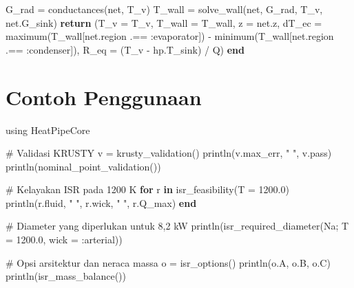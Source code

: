 \documentclass[
  indonesian,
  12pt,
  a4paper,
]{report}
\newenvironment{Shaded}{\begin{snugshade}}{\end{snugshade}}
\newcommand{\BuiltInTok}[1]{\textcolor[rgb]{0.00,0.23,0.31}{#1}}
\newcommand{\CommentTok}[1]{\textcolor[rgb]{0.37,0.37,0.37}{#1}}
\newcommand{\ControlFlowTok}[1]{\textcolor[rgb]{0.00,0.23,0.31}{\textbf{#1}}}
\newcommand{\FloatTok}[1]{\textcolor[rgb]{0.68,0.00,0.00}{#1}}
\newcommand{\FunctionTok}[1]{\textcolor[rgb]{0.28,0.35,0.67}{#1}}
\newcommand{\ImportTok}[1]{\textcolor[rgb]{0.00,0.46,0.62}{#1}}
\newcommand{\KeywordTok}[1]{\textcolor[rgb]{0.00,0.23,0.31}{\textbf{#1}}}
\newcommand{\NormalTok}[1]{\textcolor[rgb]{0.00,0.23,0.31}{#1}}
\newcommand{\OperatorTok}[1]{\textcolor[rgb]{0.37,0.37,0.37}{#1}}
\newcommand{\StringTok}[1]{\textcolor[rgb]{0.13,0.47,0.30}{#1}}
\begin{document}
\begin{Shaded}
\begin{Highlighting}[]
\NormalTok{    G\_rad }\OperatorTok{=} \FunctionTok{conductances}\NormalTok{(net, T\_v)}
\NormalTok{    T\_wall }\OperatorTok{=} \FunctionTok{solve\_wall}\NormalTok{(net, G\_rad, T\_v, net.G\_sink)}
    \ControlFlowTok{return}\NormalTok{ (T\_v }\OperatorTok{=}\NormalTok{ T\_v, T\_wall }\OperatorTok{=}\NormalTok{ T\_wall, z }\OperatorTok{=}\NormalTok{ net.z,}
\NormalTok{            dT\_ec }\OperatorTok{=} \FunctionTok{maximum}\NormalTok{(T\_wall[net.region }\OperatorTok{.==} \OperatorTok{:}\NormalTok{evaporator]) }\OperatorTok{{-}}
                    \FunctionTok{minimum}\NormalTok{(T\_wall[net.region }\OperatorTok{.==} \OperatorTok{:}\NormalTok{condenser]),}
\NormalTok{            R\_eq }\OperatorTok{=}\NormalTok{ (T\_v }\OperatorTok{{-}}\NormalTok{ hp.T\_sink) }\OperatorTok{/}\NormalTok{ Q)}
\KeywordTok{end}
\end{Highlighting}
\end{Shaded}

\section{Contoh Penggunaan}\label{contoh-penggunaan}

\begin{Shaded}
\begin{Highlighting}[]
\ImportTok{using} \BuiltInTok{HeatPipeCore}

\CommentTok{\# Validasi KRUSTY}
\NormalTok{v }\OperatorTok{=} \FunctionTok{krusty\_validation}\NormalTok{()}
\FunctionTok{println}\NormalTok{(v.max\_err, }\StringTok{" "}\NormalTok{, v.pass)}
\FunctionTok{println}\NormalTok{(}\FunctionTok{nominal\_point\_validation}\NormalTok{())}

\CommentTok{\# Kelayakan ISR pada 1200 K}
\ControlFlowTok{for}\NormalTok{ r }\KeywordTok{in} \FunctionTok{isr\_feasibility}\NormalTok{(T }\OperatorTok{=} \FloatTok{1200.0}\NormalTok{)}
    \FunctionTok{println}\NormalTok{(r.fluid, }\StringTok{" "}\NormalTok{, r.wick, }\StringTok{" "}\NormalTok{, r.Q\_max)}
\ControlFlowTok{end}

\CommentTok{\# Diameter yang diperlukan untuk 8,2 kW}
\FunctionTok{println}\NormalTok{(}\FunctionTok{isr\_required\_diameter}\NormalTok{(Na; T }\OperatorTok{=} \FloatTok{1200.0}\NormalTok{, wick }\OperatorTok{=} \OperatorTok{:}\NormalTok{arterial))}

\CommentTok{\# Opsi arsitektur dan neraca massa}
\NormalTok{o }\OperatorTok{=} \FunctionTok{isr\_options}\NormalTok{()}
\FunctionTok{println}\NormalTok{(o.A, o.B, o.C)}
\FunctionTok{println}\NormalTok{(}\FunctionTok{isr\_mass\_balance}\NormalTok{())}
\end{Highlighting}
\end{Shaded}
\end{document}
